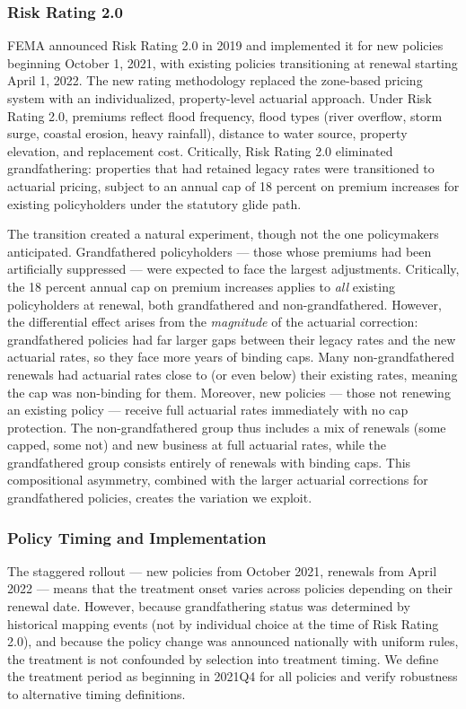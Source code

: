 \documentclass[12pt]{article}
\begin{document}
\subsubsection*{Risk Rating 2.0} FEMA announced Risk Rating 2.0 in 2019 and implemented it for new policies beginning October 1, 2021, with existing policies transitioning at renewal starting April 1, 2022. The new rating methodology replaced the zone-based pricing system with an individualized, property-level actuarial approach. Under Risk Rating 2.0, premiums reflect flood frequency, flood types (river overflow, storm surge, coastal erosion, heavy rainfall), distance to water source, property elevation, and replacement cost. Critically, Risk Rating 2.0 eliminated grandfathering: properties that had retained legacy rates were transitioned to actuarial pricing, subject to an annual cap of 18 percent on premium increases for existing policyholders under the statutory glide path.

The transition created a natural experiment, though not the one policymakers anticipated. Grandfathered policyholders --- those whose premiums had been artificially suppressed --- were expected to face the largest adjustments. Critically, the 18 percent annual cap on premium increases applies to \textit{all} existing policyholders at renewal, both grandfathered and non-grandfathered. However, the differential effect arises from the \textit{magnitude} of the actuarial correction: grandfathered policies had far larger gaps between their legacy rates and the new actuarial rates, so they face more years of binding caps. Many non-grandfathered renewals had actuarial rates close to (or even below) their existing rates, meaning the cap was non-binding for them. Moreover, new policies --- those not renewing an existing policy --- receive full actuarial rates immediately with no cap protection. The non-grandfathered group thus includes a mix of renewals (some capped, some not) and new business at full actuarial rates, while the grandfathered group consists entirely of renewals with binding caps. This compositional asymmetry, combined with the larger actuarial corrections for grandfathered policies, creates the variation we exploit.

\subsubsection*{Policy Timing and Implementation} The staggered rollout --- new policies from October 2021, renewals from April 2022 --- means that the treatment onset varies across policies depending on their renewal date. However, because grandfathering status was determined by historical mapping events (not by individual choice at the time of Risk Rating 2.0), and because the policy change was announced nationally with uniform rules, the treatment is not confounded by selection into treatment timing. We define the treatment period as beginning in 2021Q4 for all policies and verify robustness to alternative timing definitions.
\end{document}
